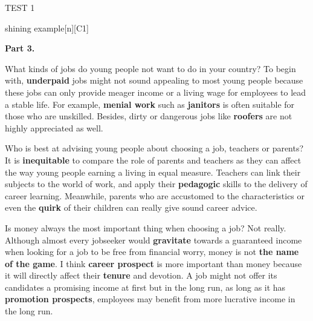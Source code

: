 \begin{glossarymc}[Cambridge 13]
\begin{test}{TEST 1}
\begin{VocabExplain}[Part 2]
            \begin{ExplainCard}{shining example}[n][C1]
            \end{ExplainCard}
        \end{VocabExplain}

    \noindent
    \textbf{Part 3.}
    \begin{qa}{What kinds of jobs do young people not want to do in your country?}
    To begin with, \textbf{underpaid} jobs might not sound appealing to most young people because these jobs can only provide meager income or a living wage for employees to lead a stable life. For example, \textbf{menial work} such as \textbf{janitors} is often suitable for those who are unskilled. Besides, dirty or dangerous jobs like \textbf{roofers} are not highly appreciated as well.
    \end{qa}

    \begin{qa}{Who is best at advising young people about choosing a job, teachers or parents?}
    It is \textbf{inequitable} to compare the role of parents and teachers as they can affect the way young people earning a living in equal measure. Teachers can link their subjects to the world of work, and apply their \textbf{pedagogic} skills to the delivery of career learning. Meanwhile, parents who are accustomed to the characteristics or even the \textbf{quirk} of their children can really give sound career advice.
    \end{qa}

    \begin{qa}{Is money always the most important thing when choosing a job?}
    Not really. Although almost every jobseeker would \textbf{gravitate} towards a guaranteed income when looking for a job to be free from financial worry, money is not \textbf{the name of the game}. I think \textbf{career prospect} is more important than money because it will directly affect their \textbf{tenure} and devotion. A job might not offer its candidates a promising income at first but in the long run, as long as it has \textbf{promotion prospects}, employees may benefit from more lucrative income in the long run.
    \end{qa}


\end{test}
\end{glossarymc}
